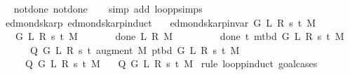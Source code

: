 \begin{isabellebody}
\endisataginvisible
{\isafoldinvisible}%
%
\isadeliminvisible
\isanewline
%
\endisadeliminvisible
%
\isadelimproof
\ \ %
\endisadelimproof
%
\isatagproof
{}\isamarkupfalse%
\ not{\isacharunderscore}{\kern0pt}done{\isacharunderscore}{\kern0pt}{}\ not{\isacharunderscore}{\kern0pt}done{\isacharunderscore}{\kern0pt}{}\isanewline
\ \ \isamarkupfalse%
\ {\isacharparenleft}{\kern0pt}simp\ add{\isacharcolon}{\kern0pt}\ loop{\isacharprime}{\kern0pt}{\isacharunderscore}{\kern0pt}psimps{\isacharparenright}{\kern0pt}%
\endisatagproof
{\isafoldproof}%
%
\isadelimproof
\isanewline
%
\endisadelimproof
%
\isadeliminvisible
\isanewline
%
\endisadeliminvisible
%
\isataginvisible
{}\isamarkupfalse%
\ {\isacharparenleft}{\kern0pt}\ edmonds{\isacharunderscore}{\kern0pt}karp{\isacharparenright}{\kern0pt}\ edmonds{\isacharunderscore}{\kern0pt}karp{\isacharunderscore}{\kern0pt}induct{\isacharcolon}{\kern0pt}\isanewline
\ \ \ {\isachardoublequoteopen}edmonds{\isacharunderscore}{\kern0pt}karp{\isacharunderscore}{\kern0pt}invar{\isacharprime}{\kern0pt}\ G\ L\ R\ s\ t\ M{\isachardoublequoteclose}\isanewline
\ \ \isanewline
\ \ \ \ {\isachardoublequoteopen}{\isasymAnd}G\ L\ R\ s\ t\ M{\isachardot}{\kern0pt}\isanewline
\ \ \ \ \ \ {\isacharparenleft}{\kern0pt}{\isasymnot}\ done{\isacharunderscore}{\kern0pt}{}\ L\ R\ M\ {\isasymLongrightarrow}\isanewline
\ \ \ \ \ \ \ {\isasymnot}\ done{\isacharunderscore}{\kern0pt}{}\ t\ {\isacharparenleft}{\kern0pt}m{\isacharunderscore}{\kern0pt}tbd\ G\ L\ R\ s\ t\ M{\isacharparenright}{\kern0pt}\ {\isasymLongrightarrow}\isanewline
\ \ \ \ \ \ \ Q\ G\ L\ R\ s\ t\ {\isacharparenleft}{\kern0pt}augment\ M\ {\isacharparenleft}{\kern0pt}p{\isacharunderscore}{\kern0pt}tbd\ G\ L\ R\ s\ t\ M{\isacharparenright}{\kern0pt}{\isacharparenright}{\kern0pt}{\isacharparenright}{\kern0pt}\ {\isasymLongrightarrow}\isanewline
\ \ \ \ \ \ Q\ G\ L\ R\ s\ t\ M{\isachardoublequoteclose}\isanewline
\ \ \ {\isachardoublequoteopen}Q\ G\ L\ R\ s\ t\ M{\isachardoublequoteclose}%
\endisataginvisible
{\isafoldinvisible}%
%
\isadeliminvisible
\isanewline
%
\endisadeliminvisible
%
\isadelimproof
%
\endisadelimproof
%
\isatagproof
{}\isamarkupfalse%
\ {\isacharparenleft}{\kern0pt}rule\ loop{\isacharprime}{\kern0pt}{\isachardot}{\kern0pt}pinduct{\isacharcomma}{\kern0pt}\ goal{\isacharunderscore}{\kern0pt}cases{\isacharparenright}{\kern0pt}\isanewline
\ \ \isamarkupfalse%
\ {}\isanewline

\end{isabellebody}
